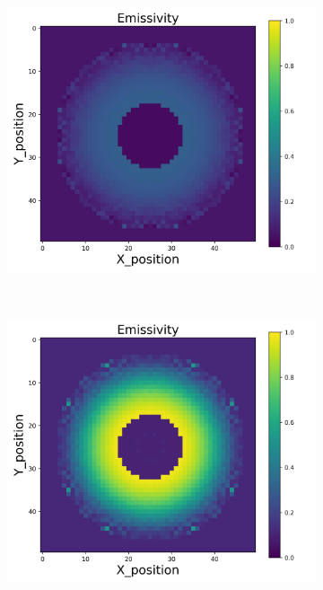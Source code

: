 \begin{figure}[p]
\begin{minipage}{\textwidth}
\begin{subfigure}{0.325\textwidth}
        \end{subfigure}
        \begin{subfigure}{0.325\textwidth}
            \centering
            \includegraphics[width=\textwidth]{figures/raw_data/21/lin_square/emi_cal.jpg}
        \end{subfigure}
    \end{minipage}\\
    \begin{minipage}{\textwidth}
        \centering
        \begin{subfigure}{0.325\textwidth}
            \centering
            \includegraphics[width=\textwidth]{figures/raw_data/22/lin_square/emi_cal.jpg}

\end{subfigure}
\end{minipage}
\end{figure}
